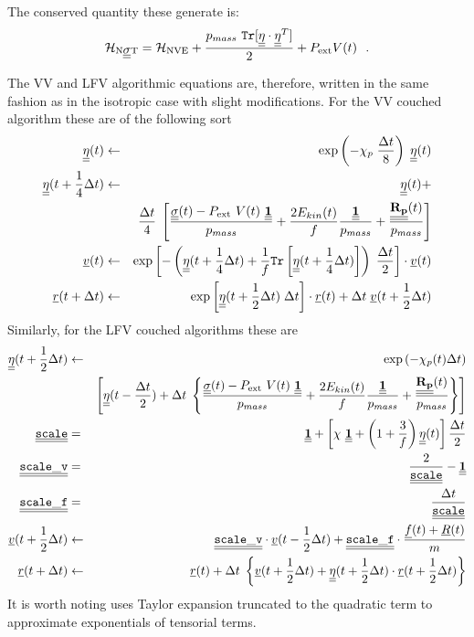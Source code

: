 The conserved quantity these generate is:
\begin{equation}
{\cal H}_{\rm N\mbox{$\underline{\underline{\bf \sigma}}$}T} = {\cal H}_{\rm NVE} + {p_{mass}~{\tt Tr}[\mbox{$\underline{\underline{\bf \eta}}$} \cdot \mbox{$\underline{\underline{\bf \eta}}$}^{T}] \over 2} + P_{\rm ext} V(t)~~.
\end{equation}

The VV and LFV algorithmic equations are, therefore,
written in the same fashion as in the isotropic case with
slight modifications.  For the VV couched algorithm
these are of the following sort
\begin{eqnarray}
\mbox{$\underline{\underline{\bf \eta}}$} (t) &\leftarrow& \exp \left( -\chi_{p} \; {\Delta t \over 8} \right) \;
\mbox{$\underline{\underline{\bf \eta}}$} (t)\nonumber \\
\mbox{$\underline{\underline{\bf \eta}}$}(t + {1 \over 4} \Delta t) &\leftarrow& \mbox{$\underline{\underline{\bf \eta}}$}(t) + \nonumber \\
&& {\Delta t \over 4} \; \left[ \frac{\mbox{$\underline{\underline{\bf \sigma}}$}(t) - P_{\rm ext}~V(t)~\mbox{$\underline{\underline{\bf 1}}$}}{p_{mass}} +
\frac{2 E_{kin}(t)}{f} \frac{\mbox{$\underline{\underline{\bf 1}}$}}{p_{mass}} + \frac{\mbox{$\underline{\underline{\bf R_{p}}}$}(t)}{p_{mass}} \right] \\
\mbox{$\underline{v}$}(t) &\leftarrow& \exp \left[ -\left( \mbox{$\underline{\underline{\bf \eta}}$}(t + {1 \over 4}\Delta t) +
\frac{1}{f} {\tt Tr}\left[\mbox{$\underline{\underline{\bf \eta}}$}(t + {1 \over 4}\Delta t)\right] \right) \;
{\Delta t \over 2} \right] \cdot \mbox{$\underline{v}$}(t) \nonumber \\
\mbox{$\underline{r}$}(t + \Delta t) &\leftarrow& \exp \left[ \mbox{$\underline{\underline{\bf \eta}}$} (t + {1 \over 2} \Delta t) \; \Delta t \right] \cdot
\mbox{$\underline{r}$}(t) + \Delta t \; \mbox{$\underline{v}$}(t + {1 \over 2} \Delta t) \nonumber
\end{eqnarray}
Similarly, for the LFV couched algorithms these are
\begin{eqnarray}
\mbox{$\underline{\underline{\bf \eta}}$}(t + {1 \over 2} \Delta t) &\leftarrow&
\exp \left( -\chi_{p} (t) \Delta t \right) \nonumber \\
&& \left[ \mbox{$\underline{\underline{\bf \eta}}$}(t - {\Delta t \over 2}) + \Delta t \;
\left\{ \frac{\mbox{$\underline{\underline{\bf \sigma}}$}(t) - P_{\rm ext}~V(t)~\mbox{$\underline{\underline{\bf 1}}$}}{p_{mass}} +
\frac{2 E_{kin}(t)}{f} \frac{\mbox{$\underline{\underline{\bf 1}}$}}{p_{mass}} +
\frac{\mbox{$\underline{\underline{\bf R_{p}}}$}(t)}{p_{mass}} \right\} \right] \nonumber \\
\mbox{$\underline{\underline{\bf \tt scale}}$} &=& \mbox{$\underline{\underline{\bf 1}}$} + \left[ \chi~\mbox{$\underline{\underline{\bf 1}}$} + \left(1+\frac{3}{f}\right) \mbox{$\underline{\underline{\bf \eta}}$} (t) \right] \frac{\Delta t}{2} \nonumber \\
\mbox{$\underline{\underline{\bf \tt scale\_v}}$} &=& \frac{2}{\mbox{$\underline{\underline{\bf \tt scale}}$}} - \mbox{$\underline{\underline{\bf 1}}$} \\
\mbox{$\underline{\underline{\bf \tt scale\_f}}$} &=& \frac{\Delta t}{\mbox{$\underline{\underline{\bf \tt scale}}$}} \nonumber \\
\mbox{$\underline{v}$}(t + {1 \over 2} \Delta t) &\leftarrow&
\mbox{$\underline{\underline{\bf \tt scale\_v}}$} \cdot \mbox{$\underline{v}$}(t - {1 \over 2} \Delta t) +
\mbox{$\underline{\underline{\bf \tt scale\_f}}$} \cdot \frac{\mbox{$\underline{f}$}(t) + \mbox{$\underline{R}$}(t)}{m} \nonumber \\
\mbox{$\underline{r}$}(t + \Delta t) &\leftarrow& \mbox{$\underline{r}$}(t) + \Delta t \;
\left\{ \mbox{$\underline{v}$}(t + {1 \over 2} \Delta t) + \mbox{$\underline{\underline{\bf \eta}}$} (t + {1 \over 2} \Delta t) \cdot
\mbox{$\underline{r}$}(t + {1 \over 2} \Delta t) \right\} \nonumber
\end{eqnarray}
It is worth noting \D uses Taylor expansion truncated to the
quadratic term to approximate exponentials of tensorial terms.

